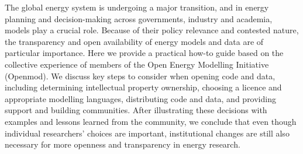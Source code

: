 The global energy system is undergoing a major transition, and in energy planning and decision-making across governments, industry and academia, models play a crucial role. Because of their policy relevance and contested nature, the transparency and open availability of energy models and data are of particular importance. Here we provide a practical how-to guide based on the collective experience of members of the Open Energy Modelling Initiative (Openmod). We discuss key steps to consider when opening code and data, including determining intellectual property ownership, choosing a licence and appropriate modelling languages, distributing code and data, and providing support and building communities. After illustrating these decisions with examples and lessons learned from the community, we conclude that even though individual researchers' choices are important, institutional changes are still also necessary for more openness and transparency in energy research.
